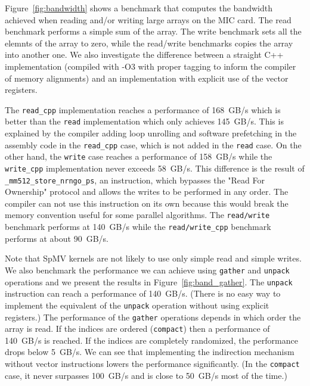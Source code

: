 \documentclass{sig-alternate}
\def\ge#1{{#1}}
\begin{document}
Figure~\ref{fig:bandwidth} shows a benchmark that computes the
bandwidth achieved when reading and/or writing large arrays on 
the MIC card. The read benchmark performs a
simple sum of the array. The write benchmark sets all the elemnts of
the array to zero, while the read/write benchmarks copies the array into
another one. We also investigate the difference between a straight C++
implementation (compiled with \mbox{-O3} with proper tagging to inform the
compiler of memory alignments) and an implementation with
explicit use of the vector registers.

The {\tt read\_cpp} implementation reaches a performance of 168~GB/s
 which is better than the {\tt read}
implementation which only achieves 145~GB/s. This
is explained by the compiler adding loop unrolling and software
prefetching in the assembly code in the {\tt read\_cpp} case, which is
not added in the {\tt read} case. On the other hand, the {\tt write}
case reaches a performance of 158~GB/s while the
{\tt write\_cpp} implementation never exceeds 58~GB/s. 
This difference is the result of {\tt \_mm512\_store\_nrngo\_ps}, 
an instruction, which bypasses the \ge{"Read For Ownership"} protocol 
and allows the writes
to be performed in any order. The compiler can not use this
instruction on its own because this would break the memory convention
useful for some parallel algorithms. The {\tt read/write} benchmark
performs at 140~GB/s while the {\tt read/write\_cpp} benchmark performs
at about 90~GB/s.

Note that SpMV kernels are not likely to use only simple read and simple
writes. We also benchmark the performance we
can achieve using {\tt gather} and {\tt unpack} operations and we
present the results in Figure~\ref{fig:band_gather}. The {\tt unpack}
instruction can reach a performance of 140~GB/s. (There is no easy way
to implement the equivalent of the {\tt unpack} operation without
using explicit registers.) The performance of the {\tt gather}
operations depends in which order the array is read. If the indices
are ordered ({\tt compact}) then a performance of 140~GB/s is
reached. If the indices are completely randomized, the performance
drops below 5~GB/s. We can see that implementing the
indirection mechanism without vector instructions lowers the
performance significantly. (In the {\tt compact} case, it never
surpasses 100~GB/s and is close to 50~GB/s most of the time.)
\end{document}
